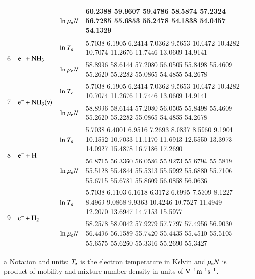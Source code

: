 \documentclass{warpdoc}
\begin{document}
\begin{table}[!htbp]
\begin{threeparttable}
\begin{tabular*}{\textwidth}{c@{\extracolsep{\fill}}llll}
  &  & ${\rm ln}~\mu_{\rm e}N$   & \tiny 60.2388   59.9607   59.4786   58.5874   57.2324   56.7285   55.6853   55.2478   54.1838   54.0457   54.1329 \\ 
  \midrule  
  \multirow{2}{*}{6} &  \multirow{2}{*}{ $\rm e^- + NH_3  $   } & ${\rm ln}~T_{\rm e}$  & \tiny     5.7038    6.1905    6.2414    7.0362    9.5653   10.0472   10.4282   10.7074   11.2676   11.7446   13.0609   14.9141 \\
  &  & ${\rm ln}~\mu_{\rm e}N$   & \tiny 58.8996   58.6144   57.2080   56.0505   55.8498   55.4609   55.2620   55.2282   55.0865   54.4855   54.2678 \\
    \midrule  
  \multirow{2}{*}{7} &  \multirow{2}{*}{ $\rm e^- + NH_3(v)  $   } & ${\rm ln}~T_{\rm e}$  & \tiny     5.7038    6.1905    6.2414    7.0362    9.5653   10.0472   10.4282   10.7074   11.2676   11.7446   13.0609   14.9141 \\
  &  & ${\rm ln}~\mu_{\rm e}N$   & \tiny 58.8996   58.6144   57.2080   56.0505   55.8498   55.4609   55.2620   55.2282   55.0865   54.4855   54.2678 \\
     \midrule  
  \multirow{2}{*}{8} &  \multirow{2}{*}{ $\rm e^- + H  $   } & ${\rm ln}~T_{\rm e}$  & \tiny         5.7038         6.4001    6.9516    7.2693    8.0837    8.5960    9.1904   10.1562   10.7033   11.1170   11.6913   12.5550   13.3973   14.0927   15.4878   16.7186   17.2690
 \\
  &  & ${\rm ln}~\mu_{\rm e}N$   & \tiny   56.8715     56.3360   56.0586   55.9273   55.6794   55.5819   55.5128   55.4844   55.5313   55.5992   55.6880   55.7106   55.6715   55.6781   55.8609   56.0858   56.0636
 \\
     \midrule  
  \multirow{2}{*}{9} &  \multirow{2}{*}{ $\rm e^- + H_2  $   } & ${\rm ln}~T_{\rm e}$  & \tiny   5.7038    6.1103    6.1618    6.3172    6.6995    7.5309    8.1227    8.4969    9.0868    9.9363   10.4246   10.7527   11.4949   12.2070   13.6947   14.7153   15.5977

 \\
  &  & ${\rm ln}~\mu_{\rm e}N$   & \tiny    58.2578   58.0042   57.9279   57.7797   57.4956   56.9030   56.4496   56.1589   55.7420   55.4435   55.4510   55.5105   55.6575   55.6260   55.3316   55.2690   55.3427

 \\
                       
    \bottomrule
    \end{tabular*}
\begin{tablenotes}
\item[{a}] Notation and units: $T_{\rm e}$ is the electron temperature in Kelvin and $\mu_{\rm e}N$ is product of mobility and mixture number density in units of $\rm V^{-1}m^{-1}s^{-1}$.
\end{tablenotes}
   \end{threeparttable}
\end{table}
\end{document}
